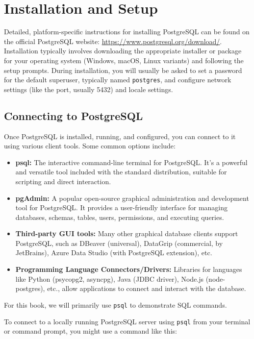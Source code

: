 \documentclass[12pt]{book}
\begin{document}
\section{Installation and Setup}

Detailed, platform-specific instructions for installing PostgreSQL can be found on the official PostgreSQL website: \href{https://www.postgresql.org/download/}{https://www.postgresql.org/download/}. Installation typically involves downloading the appropriate installer or package for your operating system (Windows, macOS, Linux variants) and following the setup prompts. During installation, you will usually be asked to set a password for the default superuser, typically named \texttt{postgres}, and configure network settings (like the port, usually 5432) and locale settings.

\subsection{Connecting to PostgreSQL}

Once PostgreSQL is installed, running, and configured, you can connect to it using various client tools. Some common options include:

\begin{itemize}
    \item \textbf{psql:} The interactive command-line terminal for PostgreSQL. It's a powerful and versatile tool included with the standard distribution, suitable for scripting and direct interaction.
    \item \textbf{pgAdmin:} A popular open-source graphical administration and development tool for PostgreSQL. It provides a user-friendly interface for managing databases, schemas, tables, users, permissions, and executing queries.
    \item \textbf{Third-party GUI tools:} Many other graphical database clients support PostgreSQL, such as DBeaver (universal), DataGrip (commercial, by JetBrains), Azure Data Studio (with PostgreSQL extension), etc.
    \item \textbf{Programming Language Connectors/Drivers:} Libraries for languages like Python (psycopg2, asyncpg), Java (JDBC driver), Node.js (node-postgres), etc., allow applications to connect and interact with the database.
\end{itemize}

For this book, we will primarily use \texttt{psql} to demonstrate SQL commands.

To connect to a locally running PostgreSQL server using \texttt{psql} from your terminal or command prompt, you might use a command like this:
\end{document}
